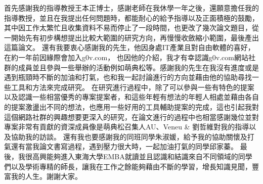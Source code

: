 \StartAcknowledgments

首先感謝我的指導教授王本正博士，感謝老師在我休學一年之後，還願意擔任我的指導教授，並且在我提出任何問題時，都能耐心的給予指導以及正面積極的鼓勵，其中因工作太繁忙且收集資料不易而停止了一段時間，也更改了幾次論文題目，從一開始先有初步構想提出比較大範圍的研究方向，再慢慢收斂縮小範圍，最後產出這篇論文。
還有我要衷心感謝我的先生，他因身處IT產業且對自由軟體的喜好，在約一年前因緣際會加入g0v.com， 也因他的介紹，我才有幸認識g0v.com網站社群的成員並且參與一些舉辦的活動例如萌典松等。感謝我的先生在我沒有進度或是遇到瓶頸時不斷的加油和打氣，也和我一起討論進行的方向並藉由他的協助尋找一些工具和方法來完成研究。
在研究進行過程中，除了可以參與一些有特色的提案以及認識一些相當優秀的專案提案者，和這些年輕有想法的年輕人相處並藉由各自的提案激盪出不同的想法，也應用一些好用的工具輔助提案的完成，這也引起我對這個網路社群的興趣想要更深入的研究，在論文進行的過程中也相當感謝幾位並對
專案非常有貢獻的資深成員像是萌典松召集人AU、Veneu \& 劉哲維對我的指導以及協助我的訪談。
還有我也要感謝我的同班同學朱淑媛，給予我的協助關懷及打氣還有當我論文書寫過程，遇到壓力很大時，一起加油打氣的同學邱家蓁。
最後，我很高興能夠進入東海大學EMBA就讀並且認識和結識來自不同領域的同學們以及學術專精的師長，讓我在工作之餘能夠藉由不斷的學習，增長知識見聞，豐富我的人生。謝謝大家。


\EndAcknowledgments
